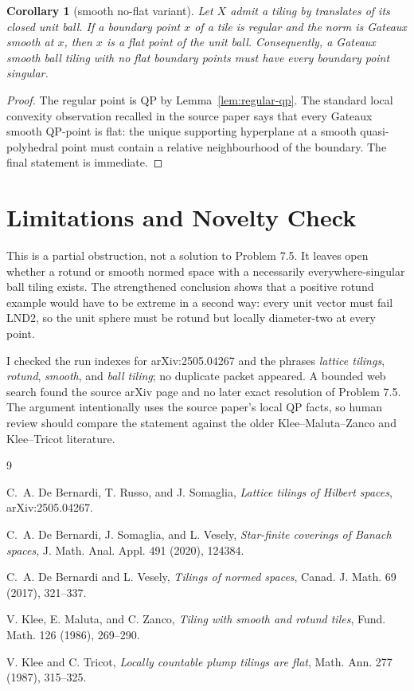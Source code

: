 \documentclass[11pt]{amsart}
\newtheorem{corollary}[theorem]{Corollary}
\theoremstyle{definition}
\theoremstyle{remark}
\begin{document}
\begin{corollary}[smooth no-flat variant]
Let \(X\) admit a tiling by translates of its closed unit ball. If a boundary
point \(x\) of a tile is regular and the norm is Gateaux smooth at \(x\), then
\(x\) is a flat point of the unit ball. Consequently, a Gateaux smooth ball
tiling with no flat boundary points must have every boundary point singular.
\end{corollary}

\begin{proof}
The regular point is QP by Lemma~\ref{lem:regular-qp}. The standard local
convexity observation recalled in the source paper says that every Gateaux
smooth QP-point is flat: the unique supporting hyperplane at a smooth
quasi-polyhedral point must contain a relative neighbourhood of the boundary.
The final statement is immediate.
\end{proof}

\section*{Limitations and Novelty Check}

This is a partial obstruction, not a solution to Problem 7.5. It leaves open
whether a rotund or smooth normed space with a necessarily everywhere-singular
ball tiling exists. The strengthened conclusion shows that a positive rotund
example would have to be extreme in a second way: every unit vector must fail
LND2, so the unit sphere must be rotund but locally diameter-two at every
point.

I checked the run indexes for arXiv:2505.04267 and the phrases
\emph{lattice tilings}, \emph{rotund}, \emph{smooth}, and \emph{ball tiling};
no duplicate packet appeared. A bounded web search found the source arXiv page
and no later exact resolution of Problem 7.5. The argument intentionally uses
the source paper's local QP facts, so human review should compare the statement
against the older Klee--Maluta--Zanco and Klee--Tricot literature.

\begin{thebibliography}{9}

C.~A. De Bernardi, T. Russo, and J. Somaglia,
\emph{Lattice tilings of Hilbert spaces}, arXiv:2505.04267.

C.~A. De Bernardi, J. Somaglia, and L. Vesely,
\emph{Star-finite coverings of Banach spaces},
J. Math. Anal. Appl. 491 (2020), 124384.

C.~A. De Bernardi and L. Vesely,
\emph{Tilings of normed spaces},
Canad. J. Math. 69 (2017), 321--337.

V. Klee, E. Maluta, and C. Zanco,
\emph{Tiling with smooth and rotund tiles},
Fund. Math. 126 (1986), 269--290.

V. Klee and C. Tricot,
\emph{Locally countable plump tilings are flat},
Math. Ann. 277 (1987), 315--325.

\end{thebibliography}
\end{document}
